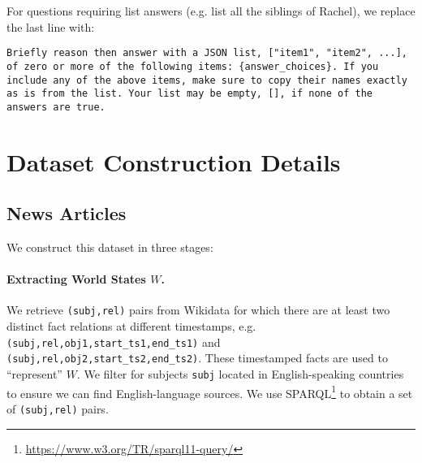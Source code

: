For questions requiring list answers (e.g. list all the siblings of Rachel), we replace the last line with:
\begin{lstlisting}
Briefly reason then answer with a JSON list, ["item1", "item2", ...], of zero or more of the following items: {answer_choices}. If you include any of the above items, make sure to copy their names exactly as is from the list. Your list may be empty, [], if none of the answers are true.
\end{lstlisting}




\section{Dataset Construction Details}
\subsection{News Articles}
\label{app:wikidata}

We construct this dataset in three stages:
\paragraph{Extracting World States $W$.} We retrieve \texttt{(subj,rel)} pairs from Wikidata for which there are at least two distinct fact relations at different timestamps, e.g. \verb|(subj,rel,obj1,start_ts1,end_ts1)| and \verb|(subj,rel,obj2,start_ts2,end_ts2)|. These timestamped facts are used to ``represent'' $W$. We filter for subjects \texttt{subj} located in English-speaking countries to ensure we can find English-language sources.
We use SPARQL\footnote{\url{https://www.w3.org/TR/sparql11-query/}} to obtain a set of \verb|(subj,rel)| pairs. 
    
